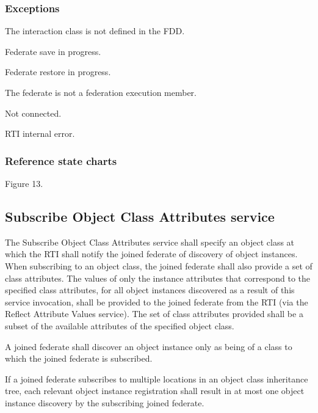 \begin{compactstdpage}
    \subsubsection{Exceptions}
    \begin{stdalphalist}
        \item The interaction class is not defined in the FDD.
        \item Federate save in progress.
        \item Federate restore in progress.
        \item The federate is not a federation execution member.
        \item Not connected.
        \item RTI internal error.
    \end{stdalphalist}

    \subsubsection{Reference state charts}
    \begin{stdalphalist}
        \item Figure 13.
    \end{stdalphalist}

    \subsection{Subscribe Object Class Attributes service}

    The Subscribe Object Class Attributes service shall specify an object class at which the RTI shall notify the joined federate of discovery of object instances. When subscribing to an object class, the joined federate shall also provide a set of class attributes. The values of only the instance attributes that correspond to the specified class attributes, for all object instances discovered as a result of this service invocation, shall be provided to the joined federate from the RTI (via the Reflect Attribute Values \rtiinitiated{} service). The set of class attributes provided shall be a subset of the available attributes of the specified object class.

    A joined federate shall discover an object instance only as being of a class to which the joined federate is subscribed.

    If a joined federate subscribes to multiple locations in an object class inheritance tree, each relevant object instance registration shall result in at most one object instance discovery by the subscribing joined federate.
\end{compactstdpage}

